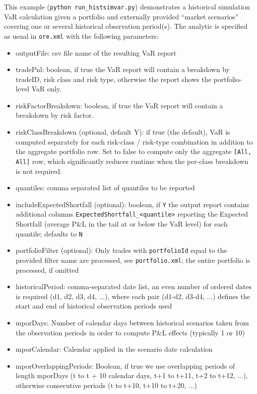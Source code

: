 This example ({\tt python run\_histsimvar.py}) demonstrates a historical simulation VaR calculation
given a portfolio and externally provided ``market scenarios'' covering
one or several historical observation period(s).
The analytic is specified as usual in {\tt ore.xml} with the following parameters:
\begin{itemize}
\item outputFile: csv file name of the resulting VaR report
\item tradePnl: boolean, if true the VaR report will contain a breakdown by tradeID, risk class and risk type, otherwise the report shows the portfolio-level VaR only.
\item riskFactorBreakdown: boolean, if true the VaR report will contain a breakdown by risk factor.
\item riskClassBreakdown (optional, default Y): if true (the default), VaR is computed separately for
  each risk-class / risk-type combination in addition to the aggregate portfolio row. Set to false to
  compute only the aggregate {\tt [All, All]} row, which significantly reduces runtime when the
  per-class breakdown is not required.
\item quantiles: comma separated list of quantiles to be reported
\item includeExpectedShortfall (optional): boolean, if {\tt Y} the output report contains additional columns {\tt ExpectedShortfall\_<quantile>} reporting the Expected Shortfall (average P\&L in the tail at or below the VaR level) for each quantile; defaults to {\tt N}
\item portfolioFilter (optional): Only trades with {\tt portfolioId} equal to the provided filter name are processed, see {\tt portfolio.xml}; the entire portfolio is processed, if omitted
\item historicalPeriod: comma-separated date list, an even number of ordered dates is required (d1, d2, d3, d4, ...), where each pair (d1-d2, d3-d4, ...) defines the start and end of historical observation periods used
\item mporDays: Number of calendar days between historical scenarios taken from the observation periods in order to compute P\&L effects (typically 1 or 10)
\item mporCalendar: Calendar applied in the scenario date calculation
\item mporOverlappingPeriods: Boolean, if true we use overlapping periods of length mporDays (t to t + 10 calendar days, t+1 to t+11, t+2 to t+12, ...), otherwise consecutive periods (t to t+10, t+10 to t+20, ...)

\end{itemize}
